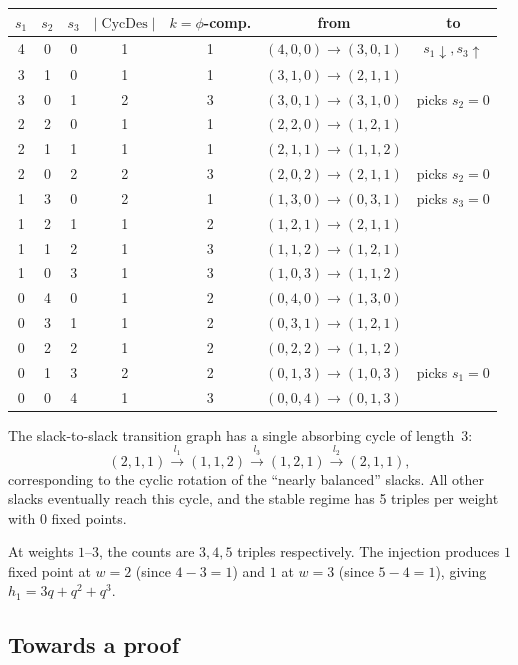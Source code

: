 \documentclass[11pt]{article}
\begin{document}
\begin{center}
\small
\begin{tabular}{cccc|c|cc}
$s_1$ & $s_2$ & $s_3$ & $|\operatorname{CycDes}|$ &
$k = \phi$-comp. & from & to \\
\hline
4 & 0 & 0 & 1 & 1 & $(4,0,0) \to (3,0,1)$ & $s_1 \downarrow, s_3 \uparrow$ \\
3 & 1 & 0 & 1 & 1 & $(3,1,0) \to (2,1,1)$ & \\
3 & 0 & 1 & 2 & 3 & $(3,0,1) \to (3,1,0)$ & picks $s_2=0$ \\
2 & 2 & 0 & 1 & 1 & $(2,2,0) \to (1,2,1)$ & \\
2 & 1 & 1 & 1 & 1 & $(2,1,1) \to (1,1,2)$ & \\
2 & 0 & 2 & 2 & 3 & $(2,0,2) \to (2,1,1)$ & picks $s_2=0$ \\
1 & 3 & 0 & 2 & 1 & $(1,3,0) \to (0,3,1)$ & picks $s_3=0$ \\
1 & 2 & 1 & 1 & 2 & $(1,2,1) \to (2,1,1)$ & \\
1 & 1 & 2 & 1 & 3 & $(1,1,2) \to (1,2,1)$ & \\
1 & 0 & 3 & 1 & 3 & $(1,0,3) \to (1,1,2)$ & \\
0 & 4 & 0 & 1 & 2 & $(0,4,0) \to (1,3,0)$ & \\
0 & 3 & 1 & 1 & 2 & $(0,3,1) \to (1,2,1)$ & \\
0 & 2 & 2 & 1 & 2 & $(0,2,2) \to (1,1,2)$ & \\
0 & 1 & 3 & 2 & 2 & $(0,1,3) \to (1,0,3)$ & picks $s_1=0$ \\
0 & 0 & 4 & 1 & 3 & $(0,0,4) \to (0,1,3)$ & \\
\end{tabular}
\end{center}

The slack-to-slack transition graph has a single absorbing cycle of length~3:
\[
  (2,1,1) \xrightarrow{l_1} (1,1,2) \xrightarrow{l_3} (1,2,1) \xrightarrow{l_2} (2,1,1),
\]
corresponding to the cyclic rotation of the ``nearly balanced'' slacks.
All other slacks eventually reach this cycle, and the stable regime has
5 triples per weight with 0 fixed points.

At weights $1$--$3$, the counts are $3, 4, 5$ triples respectively.
The injection produces $1$ fixed point at $w = 2$ (since $4 - 3 = 1$)
and $1$ at $w = 3$ (since $5 - 4 = 1$), giving
$h_1 = 3q + q^2 + q^3$.

\subsection{Towards a proof}
\end{document}
